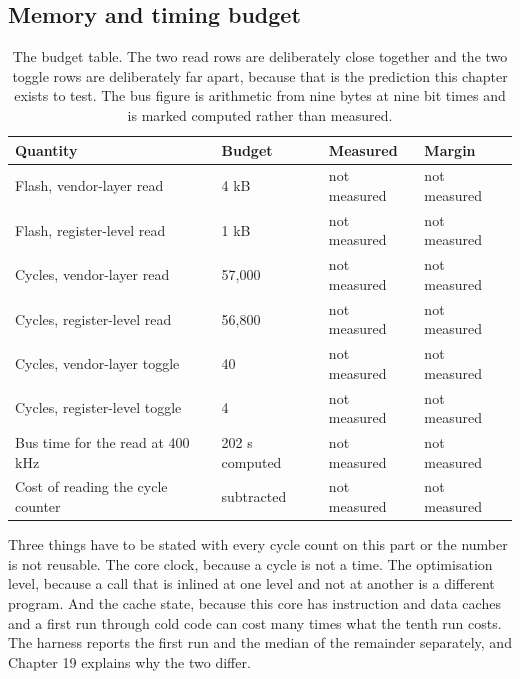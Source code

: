 \subsection*{Memory and timing budget}


\begin{table}[H]\centering\small
\begin{tabular}{p{44mm}p{28mm}p{28mm}p{30mm}}
\toprule
Quantity & Budget & Measured & Margin \\
\midrule
Flash, vendor-layer read & 4 kB & not measured & not measured \\
Flash, register-level read & 1 kB & not measured & not measured \\
Cycles, vendor-layer read & 57,000 & not measured & not measured \\
Cycles, register-level read & 56,800 & not measured & not measured \\
Cycles, vendor-layer toggle & 40 & not measured & not measured \\
Cycles, register-level toggle & 4 & not measured & not measured \\
Bus time for the read at 400 kHz & 202 \textmu{}s computed & not measured & not measured \\
Cost of reading the cycle counter & subtracted & not measured & not measured \\
\bottomrule
\end{tabular}
\caption{The budget table. The two read rows are deliberately close together and the two toggle rows are deliberately far apart, because that is the prediction this chapter exists to test. The bus figure is arithmetic from nine bytes at nine bit times and is marked computed rather than measured.}
\end{table}

Three things have to be stated with every cycle count on this part or the number
is not reusable. The core clock, because a cycle is not a time. The optimisation
level, because a call that is inlined at one level and not at another is a
different program. And the cache state, because this core has instruction and
data caches and a first run through cold code can cost many times what the
tenth run costs. The harness reports the first run and the median of the
remainder separately, and Chapter 19 explains why the two differ.

